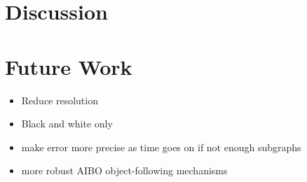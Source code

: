 \documentclass{article}
\renewcommand{\|}{\origbar} %
\begin{document}
\section{Discussion}
\label{sec:discussion}

\section{Future Work}
\label{sec:future}

\begin{itemize}
  \item Reduce resolution
  \item Black and white only
  \item make error more precise as time goes on if not enough subgraphs
  \item more robust AIBO object-following mechanisms
\end{itemize}




\end{document}
